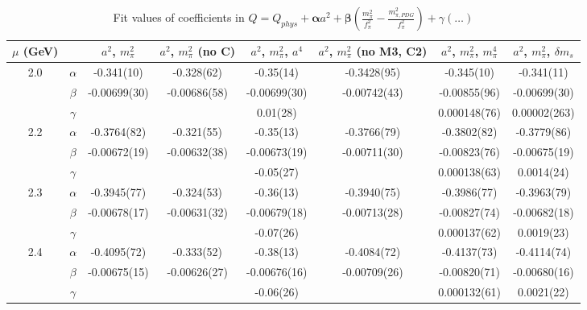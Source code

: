 \documentclass[12pt]{extarticle}
\begin{document}
\begin{table}[h!]
\begin{center}
\begin{tabular}{|c c|c|c|c|c|c|c|}
\hline
$\mu$ (GeV) &  & $a^2$, $m_\pi^2$& $a^2$, $m_\pi^2$ (no C)& $a^2$, $m_\pi^2$, $a^4$& $a^2$, $m_\pi^2$ (no M3, C2)& $a^2$, $m_\pi^2$, $m_\pi^4$& $a^2$, $m_\pi^2$, $\delta m_s$\\
\hline
\multirow{3}{0.5in}{2.0} & $\alpha$ & -0.341(10)& -0.328(62)& -0.35(14)& -0.3428(95)& -0.345(10)& -0.341(11)\\
 & $\beta$ & -0.00699(30)& -0.00686(58)& -0.00699(30)& -0.00742(43)& -0.00855(96)& -0.00699(30)\\
 & $\gamma$ &  &  & 0.01(28)&  & 0.000148(76)& 0.00002(263)\\
\hline
\multirow{3}{0.5in}{2.2} & $\alpha$ & -0.3764(82)& -0.321(55)& -0.35(13)& -0.3766(79)& -0.3802(82)& -0.3779(86)\\
 & $\beta$ & -0.00672(19)& -0.00632(38)& -0.00673(19)& -0.00711(30)& -0.00823(76)& -0.00675(19)\\
 & $\gamma$ &  &  & -0.05(27)&  & 0.000138(63)& 0.0014(24)\\
\hline
\multirow{3}{0.5in}{2.3} & $\alpha$ & -0.3945(77)& -0.324(53)& -0.36(13)& -0.3940(75)& -0.3986(77)& -0.3963(79)\\
 & $\beta$ & -0.00678(17)& -0.00631(32)& -0.00679(18)& -0.00713(28)& -0.00827(74)& -0.00682(18)\\
 & $\gamma$ &  &  & -0.07(26)&  & 0.000137(62)& 0.0019(23)\\
\hline
\multirow{3}{0.5in}{2.4} & $\alpha$ & -0.4095(72)& -0.333(52)& -0.38(13)& -0.4084(72)& -0.4137(73)& -0.4114(74)\\
 & $\beta$ & -0.00675(15)& -0.00626(27)& -0.00676(16)& -0.00709(26)& -0.00820(71)& -0.00680(16)\\
 & $\gamma$ &  &  & -0.06(26)&  & 0.000132(61)& 0.0021(22)\\
\hline
\end{tabular}
\caption{Fit values of coefficients in $Q = Q_{phys} + \mathbf{\alpha} a^2 + \mathbf{\beta}\left(\frac{m_\pi^2}{f_\pi^2}-\frac{m_{\pi,PDG}^2}{f_\pi^2}\right) + \gamma(\ldots)$}
\end{center}
\end{table}





\end{document}
